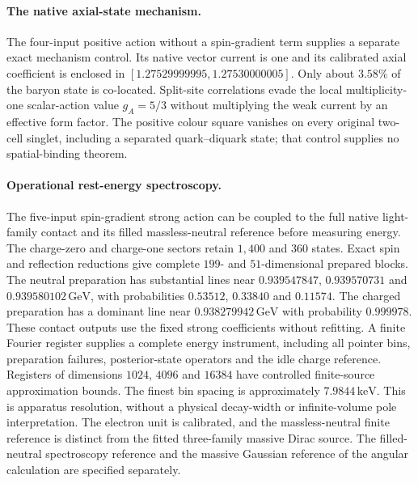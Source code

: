 \paragraph{The native axial-state mechanism.}
The four-input positive action without a spin-gradient term supplies a
separate exact mechanism control. Its native vector current is one and
its calibrated axial coefficient is enclosed in
$[1.27529999995,1.27530000005]$. Only about $3.58\%$ of the baryon state
is co-located. Split-site correlations evade the local multiplicity-one
scalar-action value $g_A=5/3$ without multiplying the weak current by an
effective form factor. The positive colour square vanishes on every
original two-cell singlet, including a separated quark--diquark state;
that control supplies no spatial-binding theorem.


\paragraph{Operational rest-energy spectroscopy.}
The five-input spin-gradient strong action can be coupled to the full native
light-family contact and its filled massless-neutral reference before
measuring energy. The charge-zero and charge-one sectors retain $1{,}400$
and $360$ states. Exact spin and reflection reductions give complete
$199$- and $51$-dimensional prepared blocks.
The neutral preparation has substantial lines near
$0.939547847$, $0.939570731$ and $0.939580102\,\mathrm{GeV}$,
with probabilities $0.53512$, $0.33840$ and $0.11574$.
The charged preparation has a dominant line near
$0.938279942\,\mathrm{GeV}$ with probability $0.999978$.
These contact outputs use the fixed strong coefficients without refitting.
A finite Fourier register supplies a complete energy instrument, including
all pointer bins, preparation failures, posterior-state operators and the
idle charge reference. Registers of dimensions $1024$, $4096$ and $16384$
have controlled finite-source approximation bounds. The finest bin spacing
is approximately $7.9844\,\mathrm{keV}$.
This is apparatus resolution, without a physical decay-width or
infinite-volume pole interpretation. The electron unit is calibrated, and
the massless-neutral finite reference is distinct from the fitted
three-family massive Dirac source.
The filled-neutral spectroscopy reference and the massive Gaussian
reference of the angular calculation are specified separately.


